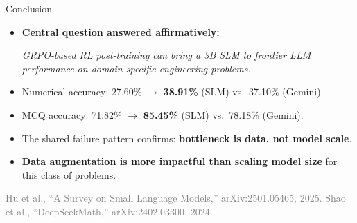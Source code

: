 \documentclass[10pt]{beamer}
\begin{document}
\begin{frame}{Conclusion}
\large
\begin{itemize}
    \item<1-> \textbf{Central question answered affirmatively:}
    \begin{center}
        \textit{GRPO-based RL post-training can bring a 3B SLM to frontier LLM performance on domain-specific engineering problems.}
    \end{center}

    \vspace{0.2cm}

    \item<1-> Numerical accuracy: 27.60\% $\to$ \textbf{38.91\%} (SLM) vs.\ 37.10\% (Gemini).

    \vspace{0.2cm}

    \item<1-> MCQ accuracy: 71.82\% $\to$ \textbf{85.45\%} (SLM) vs.\ 78.18\% (Gemini).

    \vspace{0.2cm}

    \item<2-> The shared failure pattern confirms: \textbf{bottleneck is data, not model scale}.

    \vspace{0.2cm}

    \item<2-> \textbf{Data augmentation is more impactful than scaling model size} for this class of problems.
\end{itemize}
\vspace{\fill}
{\tiny \textcolor{gray}{Hu et al., ``A Survey on Small Language Models,'' arXiv:2501.05465, 2025. \quad Shao et al., ``DeepSeekMath,'' arXiv:2402.03300, 2024.}}
\end{frame}
\end{document}
